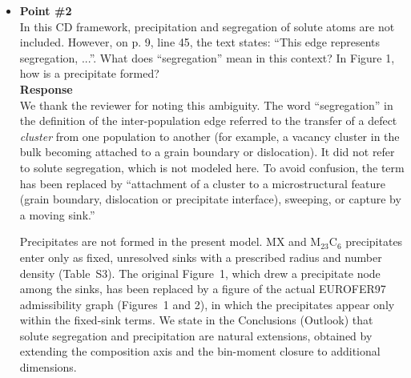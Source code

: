 \documentclass{article}
\newif\ifshowauthornotes
\newcommand{\authornote}[1]{\ifshowauthornotes{\color{red}\ [\textbf{Author action:} #1]}\fi}
\begin{document}
\begin{itemize}
What a mean-field CD model cannot represent is the \emph{spatial correlation} of the surviving cascade debris, i.e., the enhanced recombination between defects of the same cascade in the period after the MD simulation ends. This limitation is shared by all rate-theory models. It has been examined by Ortiz and Caturla (Phys.\ Rev.\ B 75 (2007) 184101) and by Souidi et al.\ (J.\ Nucl.\ Mater.\ 419 (2011) 122). We have added a sentence in Supplementary Section~S1 stating that the source term represents post-cascade survival and clustering, and that correlated recombination beyond the MD time window is not included. The clustered fractions are also the quantities that control production bias, which the revised manuscript shows to be decisive for loop--cavity co-growth (Section~3.1 and Supplementary Section~S4.2).

\authornote{Add the sentence referred to above to Supplementary Section~S1 (``Primary damage'' paragraph); it is not in the September 17 PDF.}

\item \textbf{Point \#2}\\
In this CD framework, precipitation and segregation of solute atoms are not included. However, on p. 9, line 45, the text states: ``This edge represents segregation, ...''. What does ``segregation'' mean in this context? In Figure 1, how is a precipitate formed?\\

\textbf{Response}\\
We thank the reviewer for noting this ambiguity. The word ``segregation'' in the definition of the inter-population edge referred to the transfer of a defect \emph{cluster} from one population to another (for example, a vacancy cluster in the bulk becoming attached to a grain boundary or dislocation). It did not refer to solute segregation, which is not modeled here. To avoid confusion, the term has been replaced by ``attachment of a cluster to a microstructural feature (grain boundary, dislocation or precipitate interface), sweeping, or capture by a moving sink.''

Precipitates are not formed in the present model. MX and M$_{23}$C$_6$ precipitates enter only as fixed, unresolved sinks with a prescribed radius and number density (Table~S3). The original Figure~1, which drew a precipitate node among the sinks, has been replaced by a figure of the actual EUROFER97 admissibility graph (Figures~1 and 2), in which the precipitates appear only within the fixed-sink terms. We state in the Conclusions (Outlook) that solute segregation and precipitation are natural extensions, obtained by extending the composition axis and the bin-moment closure to additional dimensions.


\end{itemize}
\end{document}
